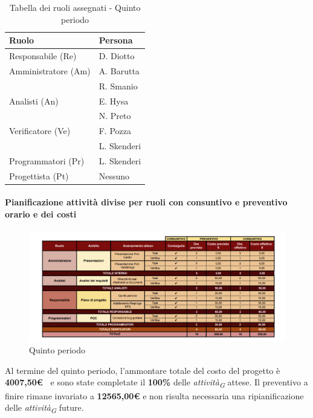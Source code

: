 \begin{table}[H]
    \centering
    \begin{tabular}{|L{4cm}|L{2cm}|}
    \hline
    \textbf{Ruolo} & \textbf{Persona} \\
    \hline
    \hline
    Responsabile (Re)   & D. Diotto \\
    \hline
    Amministratore (Am) & A. Barutta  \\
                        & R. Smanio \\
    \hline
    Analisti (An)       & E. Hysa \\
                        & N. Preto \\
    \hline
    Verificatore (Ve)   & F. Pozza \\
                        & L. Skenderi\\
     \hline
    Programmatori (Pr)  & L. Skenderi \\    
    \hline
    Progettista (Pt)    & Nessuno \\
    \hline
    \end{tabular}
    \caption{Tabella dei ruoli assegnati - Quinto periodo}
    \label{tab:Ruoli_persone_5}
    \end{table}

\newpage
\paragraph{Pianificazione attività divise per ruoli con consuntivo e preventivo orario e dei costi}

\begin{figure}[H]
    \centering
    \includegraphics[width=\linewidth, height=0.9\textheight, keepaspectratio]{../Images/tabG5.PNG}
    \caption{Quinto periodo}
    \label{fig:Quinto_periodo}
\end{figure}

\vspace{1cm}

Al termine del quinto periodo, l'ammontare totale del costo del progetto è \textbf{4007,50\euro\ } e sono state completate il \textbf{100\%} delle \textit{attività}\textsubscript{\textit{G}} attese.
Il preventivo a finire rimane invariato a \textbf{12565,00€} e non risulta necessaria una ripianificazione delle \textit{attività}\textsubscript{\textit{G}} future.

